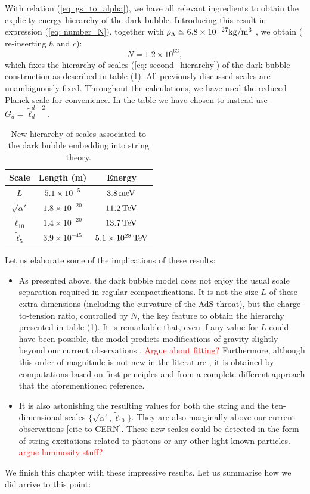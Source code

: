 With relation (\ref{eq: gs_to_alpha}), we have all relevant ingredients to obtain the explicity energy hierarchy of the dark bubble. Introducing this result in expression (\ref{eq: number_N}), together with $\rho_\Lambda \simeq 6.8 \times 10^{-27} {\rm kg/m^3}$ \cite{Aghanim:2020aa}, we obtain ( re-inserting $\hbar$ and $c$):
\begin{equation}
    N = 1.2 \times 10^{63},
\end{equation}
which fixes the hierarchy of scales (\ref{eq: second_hierarchy}) of the dark bubble construction as described in table (\ref{Table: 1}). All previously discussed scales are unambiguously fixed. Throughout the calculations, we have used the reduced Planck scale for convenience. In the table we have chosen to instead use $G_d=\tilde{\ell}_d^{d-2}$.
\begin{table}[h!]
	\centering
	\begin{tabular}{c|c|c}
	\textbf{Scale} & \textbf{Length (m)} & \textbf{Energy} \\
	\hline
    \hline
	$L$ &  $5.1 \times 10^{-5}$ &  $3.8 \, {\rm meV}$ \\
    $\sqrt{\alpha'}$ & $1.8 \times 10^{-20}$ & $11.2\, {\rm TeV}$  \\
    $\tilde{\ell}_{10}$ & $1.4 \times 10^{-20}$ &  $13.7 \, {\rm TeV}$ \\
    $\tilde{\ell}_{5}$ & $3.9 \times 10^{-45}$ & $5.1 \times 10^{28} \,{\rm TeV}$
	\end{tabular}
	\caption{New hierarchy of scales associated to the dark bubble embedding into string theory.}
	\label{Table: 1}
\end{table}

Let us elaborate some of the implications of these results:

\begin{itemize}
    \item As presented above, the dark bubble model does not enjoy the usual scale separation required in regular compactifications. It is not the size $L$ of these extra dimensions (including the curvature of the AdS-throat), but the charge-to-tension ratio, controlled by $N$, the key feature to obtain the hierarchy presented in table (\ref{Table: 1}). It is remarkable that, even if any value for $L$ could have been possible, the model predicts modifications of gravity slightly beyond our current observations \cite{Lee_2020}. \textcolor{red}{Argue about fitting?}  Furthermore, although this order of magnitude is not new in the literature \cite{Montero:2022aa}, it is obtained by computations based on first principles and from a complete different approach that the aforementioned reference.
    \item It is also astonishing the resulting values for both the string and the ten-dimensional scales $\{\sqrt{\alpha'}, \tilde{\ell}_{10}\}$. They are also marginally above our current observations [cite to CERN]. These new scales could be detected in the form of string excitations related to photons or any other light known particles. \textcolor{red}{argue luminosity stuff?}
\end{itemize}
We finish this chapter with these impressive results. Let us summarise how we did arrive to this point:
 
